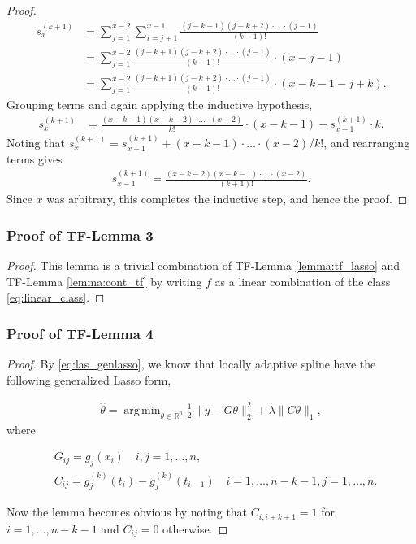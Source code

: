 \documentclass[a4paper]{article}
\DeclareMathOperator*{\argmin}{arg\,min}
\newcommand{\RR}{\mathbb{R}}
\begin{document}
\begin{proof}
\begin{align*}
s_x^{(k+1)} &= \sum_{j=1}^{x-2}\sum_{i=j+1}^{x-1}\frac{(j-k+1)(j-k+2)\cdot\ldots\cdot(j-1)}{(k-1)!}\\
&= \sum_{j=1}^{x-2} \frac{(j-k+1)(j-k+2)\cdot\ldots\cdot(j-1)}{(k-1)!}\cdot(x-j-1)\\
&= \sum_{j=1}^{x-2}\frac{(j-k+1)(j-k+2)\cdot\ldots\cdot(j-1)}{(k-1)!}\cdot(x-k-1-j+k).
\end{align*}
Grouping terms and again applying the inductive hypothesis,
\begin{align*}
s_x^{(k+1)} &= \frac{(x-k-1)(x-k-2)\cdot\ldots\cdot(x-2)}{k!}\cdot(x-k-1)-s_{x-1}^{(k+1)}\cdot k.
\end{align*}
Noting that $s_x^{(k+1)} = s_{x-1}^{(k+1)}+(x-k-1)\cdot\ldots\cdot(x-2)/k!$, and rearranging terms gives
\begin{align*}
s_{x-1}^{(k+1)} = \frac{(x-k-2)(x-k-1)\cdot\ldots\cdot(x-2)}{(k+1)!}.
\end{align*}
Since $x$ was arbitrary, this completes the inductive step, and hence the proof.
\end{proof}

\subsubsection{Proof of TF-Lemma 3}
\begin{proof}
This lemma is a trivial combination of TF-Lemma \ref{lemma:tf_lasso} and TF-Lemma \ref{lemma:cont_tf} by writing $f$ as a linear combination of the class \eqref{eq:linear_class}.
\end{proof}

\subsubsection{Proof of TF-Lemma 4}
\begin{proof}
By \eqref{eq:las_genlasso}, we know that locally adaptive spline have the following generalized Lasso form,

\begin{align*}
\hat{\theta} = \argmin_{\theta\in\RR^n} \frac{1}{2}\|y-G\theta\|_2^2 + \lambda\|C\theta\|_1,
\end{align*}
where 

\begin{align*}
&G_{ij} = g_j(x_i) \quad i,j = 1,\ldots, n,\\
&C_{ij} = g_j^{(k)}(t_i) - g_j^{(k)}(t_{i-1}) \quad i = 1,\ldots, n-k-1, j= 1,\ldots, n.
\end{align*}

Now the lemma becomes obvious by noting that $C_{i, i+k+1} =1$ for $i = 1,\ldots, n-k-1$ and $C_{ij} = 0$ otherwise. 
\end{proof}
\end{document}
